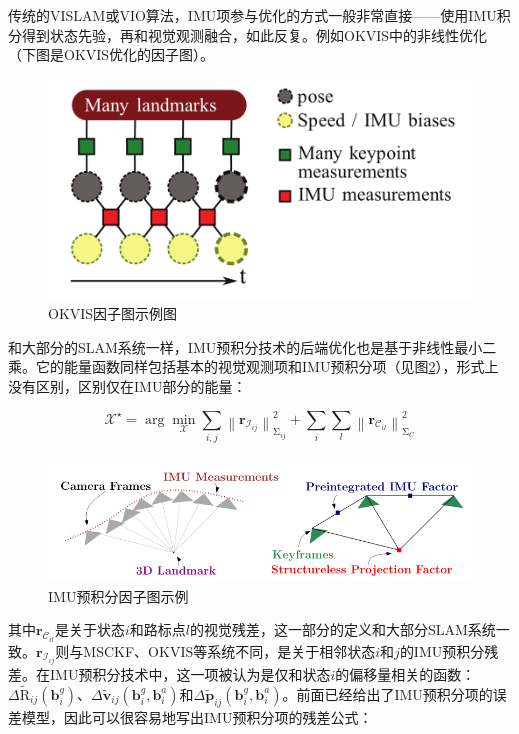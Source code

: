 传统的VISLAM或VIO算法，IMU项参与优化的方式一般非常直接——使用IMU积分得到状态先验，再和视觉观测融合，如此反复。例如OKVIS中的非线性优化（下图是OKVIS优化的因子图）。

\begin{figure}[htb!]
    \centering
    \includegraphics[width=.6\textwidth]{./figs/okvis.png}
    \caption{OKVIS因子图示例图\citep{leutenegger2015keyframe}}
    \label{fig:okvis}
\end{figure}

和大部分的SLAM系统一样，IMU预积分技术的后端优化也是基于非线性最小二乘。它的能量函数同样包括基本的视觉观测项和IMU预积分项（见图\ref{fig:preint}），形式上没有区别，区别仅在IMU部分的能量：

\begin{equation}\label{eq:gtsam_res}
    \bm{\mathcal X}^\star =
        \arg\mathop{\min}_{\bm{\mathcal X}}
        \sum_{i,j}\left\| \bm{r}_{\mathcal{I}_{ij}} \right\|^2_{\mathrm\Sigma_{ij}} +
        \sum_{i} \sum_{l} \left\| \bm{r}_{\mathcal{C}_{il}} \right\|^2_{\mathrm\Sigma_{C}}
\end{equation}

\begin{figure}[htb!]
    \centering
    \includegraphics[width=.8\textwidth]{./figs/preint.png}
    \caption{IMU预积分因子图示例\citep{forster2017manifold}}
    \label{fig:preint}
\end{figure}

其中$\bm{r}_{\mathcal{C}_{il}}$是关于状态$i$和路标点$l$的视觉残差，这一部分的定义和大部分SLAM系统一致。$\bm{r}_{\mathcal{I}_{ij}}$则与MSCKF、OKVIS等系统不同，是关于相邻状态$i$和$j$的IMU预积分残差。在IMU预积分技术中，这一项被认为是仅和状态$i$的偏移量相关的函数：$\Delta\tilde{\mathrm R}_{ij}(\bm{b}^g_i)$、$\Delta\tilde{\bm v}_{ij}(\bm{b}^g_i, \bm{b}^a_i)$和$\Delta\tilde{\bm p}_{ij}(\bm{b}^g_i, \bm{b}^a_i)$。前面已经给出了IMU预积分项的误差模型，因此可以很容易地写出IMU预积分项的残差公式：

